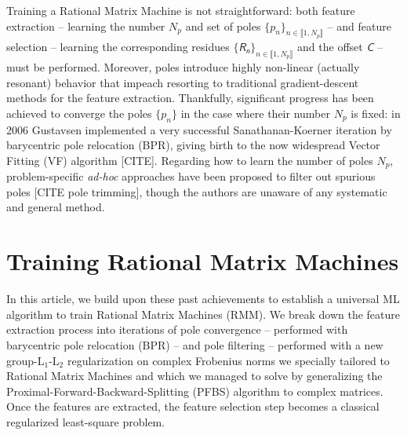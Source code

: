 \documentclass{article}
\newcommand{\mat}[1]{\bm{\mathsfit{#1}}}
\begin{document}
Training a Rational Matrix Machine is not straightforward: both feature extraction -- learning the number $N_p$ and set of poles $\big\{ p_n \big\}_{n \in \llbracket 1, N_p \rrbracket}$ -- and feature selection -- learning the corresponding residues $\big\{ \mat{R_n} \big\}_{n \in \llbracket 1, N_p \rrbracket}$ and the offset $\mat{C}$ -- must be performed.
Moreover, poles introduce highly non-linear (actually resonant) behavior that impeach resorting to traditional gradient-descent methods for the feature extraction.
Thankfully, significant progress has been achieved to converge the poles $\big\{ p_n \big\}$ in the case where their number $N_p$ is fixed: in 2006 Gustavsen implemented a very successful Sanathanan-Koerner iteration by barycentric pole relocation (BPR), giving birth to the now widespread Vector Fitting (VF) algorithm [CITE]. 
Regarding how to learn the number of poles $N_p$, problem-specific \textit{ad-hoc} approaches have been proposed to filter out spurious poles [CITE pole trimming], though the authors are unaware of any systematic and general method.

\section{\label{sec: Training Rational Matrix Machines}Training Rational Matrix Machines}

In this article, we build upon these past achievements to establish a universal ML algorithm to train Rational Matrix Machines (RMM). We break down the feature extraction process into iterations of pole convergence -- performed with barycentric pole relocation (BPR) -- and pole filtering -- performed with a new group-$\mathrm{L_1}$-$\mathrm{L_2}$ regularization on complex Frobenius norms we specially tailored to Rational Matrix Machines and which we managed to solve by generalizing the Proximal-Forward-Backward-Splitting (PFBS) algorithm to complex matrices. 
Once the features are extracted, the feature selection step becomes a classical regularized least-square problem. 

\end{document}
